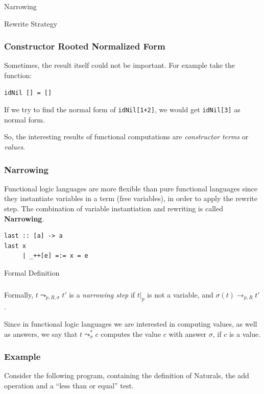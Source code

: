 \documentclass{beamer}
\begin{document}
\begin{section}{Narrowing}
\begin{subsection}{Rewrite Strategy}
\begin{frame}[fragile]

\frametitle{Constructor Rooted Normalized Form}
Sometimes, the result itself could not be important. For example take the function:

\begin{example}
\begin{verbatim}
idNil [] = []
\end{verbatim}
\end{example}
If we try to find the normal form of \verb|idNil[1+2]|, we would get \verb|idNil[3]| as normal form.

So, the interesting results of functional computations are \textit{constructor terms} or \textit{values}.
\end{frame}

\begin{frame}
[fragile]

\frametitle{Narrowing}

Functional logic languages are more flexible than pure functional languages since they instantiate variables in a term (free variables), in order to apply the rewrite step. The combination of variable instantiation and rewriting is called \textbf{Narrowing}.
\begin{example}
\begin{verbatim}
last :: [a] -> a
last x
     | _++[e] =:= x = e
\end{verbatim}
\end{example}
\end{frame}

\end{subsection}

\begin{subsection}{Formal Definition}
\begin{frame}
\frametitle{\subsecname}
  Formally, $t \leadsto _{p,R,\sigma} t'$ is a \textit{narrowing step} if $t|_p$ is not a variable, and $\sigma(t) \rightarrow_{p,R} t'$.


\bigskip
 Since in functional logic languages we are interested in computing values, as well as answers, we say that $t \leadsto ^ * _ \sigma c$ computes the value $c$ with answer $\sigma$, if $c$ is a value.
  \end{frame}
\end{subsection}

  
\begin{frame}
[fragile]

\frametitle{Example}
  Consider the following program, containing the definition of Naturals, the add operation and a ``less than or equal'' test.


\end{frame}
\end{section}
\end{document}

